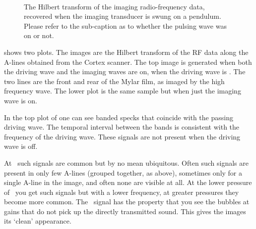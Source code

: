 \begin{figure}[h]
     \centering
 \\
\caption{The Hilbert transform of the imaging radio-frequency data, recovered when the imaging transducer is swung on a pendulum.  Please refer to the sub-caption as to whether the pulsing wave was on or not.}
\label{fig:water_cavitation_prelim}
\end{figure}



 shows two plots.
The images are the Hilbert transform of the RF data along the A-lines obtained from the Cortex scanner.
%
The top image is generated when both the driving wave and the imaging waves are on,
when the driving wave is \dbThirty.
The two lines are the front and rear of the Mylar film, as imaged by the high frequency wave.
The lower plot is the same sample but when just the imaging wave is on.


In the top plot of  one can see banded specks that coincide  with the passing  driving wave.  
The temporal interval between the bands is consistent with the frequency of the driving wave.
These signals are not present when the driving wave is off. %

At \dbThirty\  such signals are  common but by no mean ubiquitous.
Often such signals are present in only  few A-lines (grouped together, as above), sometimes only for a single A-line in the image, and often none are visible at all.
At the lower pressure of \dbThirtyTwo\ you get such signals but with a lower frequency,
at greater pressures they become more common.
The \dbThirty\ signal has the property that you see  the bubbles at gains that  do not pick up the directly transmitted sound.
This gives the images its `clean' appearance.


